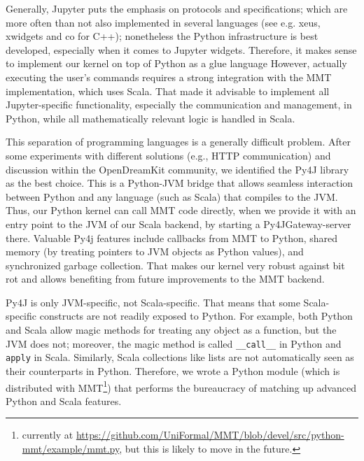 Generally, Jupyter puts the emphasis on protocols and specifications; which are more often than not also implemented in several languages (see e.g. xeus, xwidgets and co for C++); nonetheless the Python infrastructure is best developed, especially when it comes to Jupyter widgets. 
Therefore, it makes sense to implement our kernel on top of  Python as a glue language
However, actually executing the user's commands requires a strong integration with the MMT implementation, which uses Scala.
That made it advisable to implement all Jupyter-specific functionality, especially the communication and management, in Python, while all mathematically relevant logic is handled in Scala.

This separation of programming languages is a generally difficult problem.
After some experiments with different solutions (e.g., HTTP communication) and discussion within the OpenDreamKit community, we identified the Py4J library~\cite{Py4J:on} as the best choice.
This is a Python-JVM bridge that allows seamless interaction between Python and any language (such as Scala) that compiles to the JVM.
Thus, our Python kernel can call MMT code directly, when we provide it with an entry point to the JVM of our Scala backend, by starting a Py4JGateway-server there.
Valuable Py4j features include callbacks from MMT to Python, shared memory (by treating pointers to JVM objects as Python values), and synchronized garbage collection.
That makes our kernel very robust against bit rot and allows benefiting from future improvements to the MMT backend.

Py4J is only JVM-specific, not Scala-specific.  That means that some Scala-specific constructs are not readily exposed to Python.  For example, both Python and Scala allow magic methods for treating any object as a function, but the JVM does not; moreover, the magic method is called \texttt{\_\_call\_\_} in Python and \texttt{apply} in Scala.  Similarly, Scala collections like lists are not automatically seen as their counterparts in Python.  Therefore, we wrote a Python module (which is distributed with MMT\footnote{currently at \url{https://github.com/UniFormal/MMT/blob/devel/src/python-mmt/example/mmt.py}, but this is likely to move in the future.}) that performs the bureaucracy of matching up advanced Python and Scala features.


